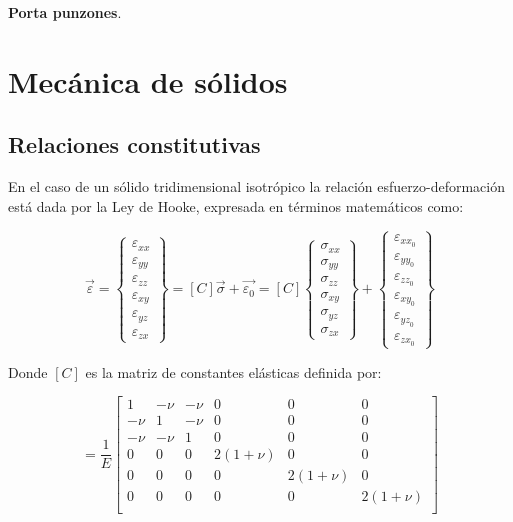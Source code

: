 \textbf{Porta punzones}. 



\section{Mecánica de sólidos}

\subsection{Relaciones constitutivas}

En el caso de un sólido tridimensional isotrópico la relación esfuerzo-deformación está dada por la Ley de Hooke, 
expresada en términos matemáticos como:

\begin{equation}\label{eq:ecdef}
\vec{\varepsilon} = 
\left\{\begin{matrix}
\varepsilon_{xx} \\ \varepsilon_{yy} \\ \varepsilon_{zz} \\ \varepsilon_{xy} \\ \varepsilon_{yz} \\ \varepsilon_{zx}
\end{matrix}\right\} = 
\left[ C \right] \vec{\sigma} + \vec{\varepsilon_0} = 
\left[ C \right]
\left\{\begin{matrix}
\sigma_{xx} \\ \sigma_{yy} \\ \sigma_{zz} \\ \sigma_{xy} \\ \sigma_{yz} \\ \sigma_{zx}
\end{matrix}\right\} + 
\left\{\begin{matrix}
\varepsilon_{xx}_0 \\ \varepsilon_{yy}_0 \\ \varepsilon_{zz}_0 \\ \varepsilon_{xy}_0 \\ \varepsilon_{yz}_0 \\ \varepsilon_{zx}_0
\end{matrix}\right\}
\end{equation}

Donde $[C]$ es la matriz de constantes elásticas definida por:

\begin{equation}
[C] = \frac{1}{E}
\left[\begin{matrix}
1 & -\nu & -\nu & 0 & 0 & 0 \\
-\nu & 1 & -\nu & 0 & 0 & 0 \\
-\nu & -\nu & 1 & 0 & 0 & 0 \\
0 & 0 & 0 & 2(1+\nu) & 0 & 0 \\
0 & 0 & 0 & 0 & 2(1+\nu) & 0 \\
0 & 0 & 0 & 0 & 0 & 2(1+\nu) \\
\end{matrix}\right]
\end{equation}

